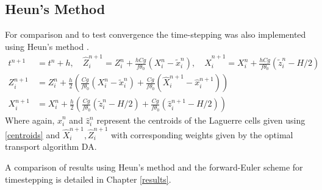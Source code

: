 \subsection{Heun's Method \label{Heun}}
For comparison and to test convergence the time-stepping was also implemented using Heun's method \cite{Griffiths2010}.
\begin{equation}
	\begin{aligned}
	t^{n+1} &= t^{n} + h, \quad
	\hat{Z}_i^{n+1} = Z_i^n +  \frac{hCg}{f\theta_0}\left(X_i^n-\tilde{x}_i^n\right), \quad
	\hat{X}_i^{n+1}  = X_i^n +  \frac{hCg}{f\theta_0}\left(\tilde{z}_i^n-H/2\right)\\
	Z_i^{n+1} &= Z_i^n + \frac{h}{2}\left( \frac{Cg}{f\theta_0}\left(X_i^n-\tilde{x}_i^n\right)+ \frac{Cg}{f\theta_0}\left(\hat{X}_i^{n+1}-\hat{x}_i^{n+1}\right)\right)\\
	X_i^{n+1}  &= X_i^n + \frac{h}{2}\left( \frac{Cg}{f\theta_0}\left(\tilde{z}_i^n-H/2\right) + \frac{Cg}{f\theta_0}\left(\hat{z}_i^{n+1}-H/2\right)\right)
	\end{aligned}
\end{equation}
Where again, $\hat{x}_i^n$ and $\hat{z}_i^n$ represent the centroids of the Laguerre cells given using \ref{centroids} and $\hat{X}_i^{n+1},\hat{Z}_i^{n+1}$ with corresponding weights given by the optimal transport algorithm DA.

A comparison of results using Heun's method and the forward-Euler scheme for timestepping is detailed in Chapter \ref{results}.
